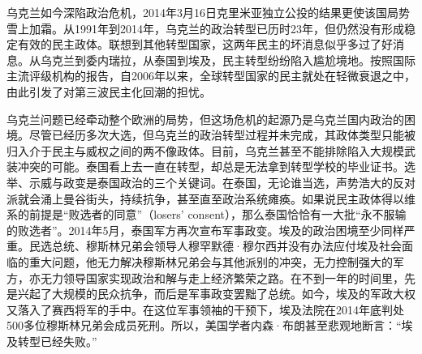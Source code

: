 





乌克兰如今深陷政治危机，2014年3月16日克里米亚独立公投的结果更使该国局势雪上加霜。从1991年到2014年，乌克兰的政治转型已历时23年，但仍然没有形成稳定有效的民主政体。联想到其他转型国家，这两年民主的坏消息似乎多过了好消息。从乌克兰到委内瑞拉，从泰国到埃及，民主转型纷纷陷入尴尬境地。按照国际主流评级机构的报告，自2006年以来，全球转型国家的民主就处在轻微衰退之中，由此引发了对第三波民主化回潮的担忧。

乌克兰问题已经牵动整个欧洲的局势，但这场危机的起源乃是乌克兰国内政治的困境。尽管已经历多次大选，但乌克兰的政治转型过程并未完成，其政体类型只能被归入介于民主与威权之间的两不像政体。目前，乌克兰甚至不能排除陷入大规模武装冲突的可能。泰国看上去一直在转型，却总是无法拿到转型学校的毕业证书。选举、示威与政变是泰国政治的三个关键词。在泰国，无论谁当选，声势浩大的反对派就会涌上曼谷街头，持续抗争，甚至直至政治系统瘫痪。如果说民主政体得以维系的前提是“败选者的同意”（losers' consent），那么泰国恰恰有一大批“永不服输的败选者”。2014年5月，泰国军方再次宣布军事政变。埃及的政治困境至少同样严重。民选总统、穆斯林兄弟会领导人穆罕默德·穆尔西并没有办法应付埃及社会面临的重大问题，他无力解决穆斯林兄弟会与其他派别的冲突，无力控制强大的军方，亦无力领导国家实现政治和解与走上经济繁荣之路。在不到一年的时间里，先是兴起了大规模的民众抗争，而后是军事政变罢黜了总统。如今，埃及的军政大权又落入了赛西将军的手中。在这位军事领袖的干预下，埃及法院在2014年底判处500多位穆斯林兄弟会成员死刑。所以，美国学者内森·布朗甚至悲观地断言：“埃及转型已经失败。”

